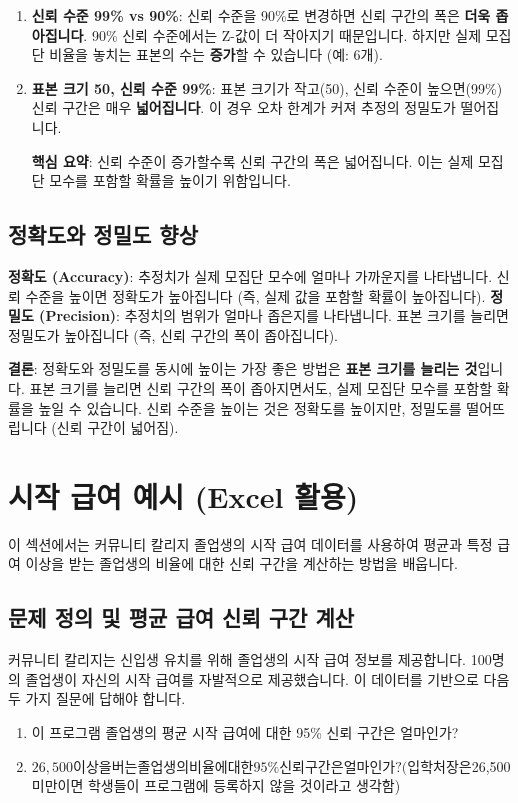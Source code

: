 \documentclass[11pt,a4paper]{article}
\begin{document}
\begin{enumerate}
\begin{enumerate}
\begin{enumerate}
    \item \textbf{신뢰 수준 99\% vs 90\%}:
    신뢰 수준을 90\%로 변경하면 신뢰 구간의 폭은 \textbf{더욱 좁아집니다}. 90\% 신뢰 수준에서는 Z-값이 더 작아지기 때문입니다. 하지만 실제 모집단 비율을 놓치는 표본의 수는 \textbf{증가}할 수 있습니다 (예: 6개).

    \item \textbf{표본 크기 50, 신뢰 수준 99\%}:
    표본 크기가 작고(50), 신뢰 수준이 높으면(99\%) 신뢰 구간은 매우 \textbf{넓어집니다}. 이 경우 오차 한계가 커져 추정의 정밀도가 떨어집니다.
    \begin{summarybox}
        \textbf{핵심 요약}: 신뢰 수준이 증가할수록 신뢰 구간의 폭은 넓어집니다. 이는 실제 모집단 모수를 포함할 확률을 높이기 위함입니다.
    \end{summarybox}
\end{enumerate}

\subsection{정확도와 정밀도 향상}
\begin{tcolorbox}[title=정확도와 정밀도 향상 전략, mybox]
    \textbf{정확도 (Accuracy)}: 추정치가 실제 모집단 모수에 얼마나 가까운지를 나타냅니다. 신뢰 수준을 높이면 정확도가 높아집니다 (즉, 실제 값을 포함할 확률이 높아집니다).
    \textbf{정밀도 (Precision)}: 추정치의 범위가 얼마나 좁은지를 나타냅니다. 표본 크기를 늘리면 정밀도가 높아집니다 (즉, 신뢰 구간의 폭이 좁아집니다).

    \textbf{결론}: 정확도와 정밀도를 동시에 높이는 가장 좋은 방법은 \textbf{표본 크기를 늘리는 것}입니다. 표본 크기를 늘리면 신뢰 구간의 폭이 좁아지면서도, 실제 모집단 모수를 포함할 확률을 높일 수 있습니다. 신뢰 수준을 높이는 것은 정확도를 높이지만, 정밀도를 떨어뜨립니다 (신뢰 구간이 넓어짐).
\end{tcolorbox}

\newpage
\section{시작 급여 예시 (Excel 활용)}
이 섹션에서는 커뮤니티 칼리지 졸업생의 시작 급여 데이터를 사용하여 평균과 특정 급여 이상을 받는 졸업생의 비율에 대한 신뢰 구간을 계산하는 방법을 배웁니다.

\subsection{문제 정의 및 평균 급여 신뢰 구간 계산}
커뮤니티 칼리지는 신입생 유치를 위해 졸업생의 시작 급여 정보를 제공합니다. 100명의 졸업생이 자신의 시작 급여를 자발적으로 제공했습니다. 이 데이터를 기반으로 다음 두 가지 질문에 답해야 합니다.
\begin{enumerate}
    \item 이 프로그램 졸업생의 평균 시작 급여에 대한 95\% 신뢰 구간은 얼마인가?
    \item $26,500 이상을 버는 졸업생의 비율에 대한 95\% 신뢰 구간은 얼마인가? (입학처장은 $26,500 미만이면 학생들이 프로그램에 등록하지 않을 것이라고 생각함)
\end{enumerate}


\end{enumerate}
\end{enumerate}
\end{document}
